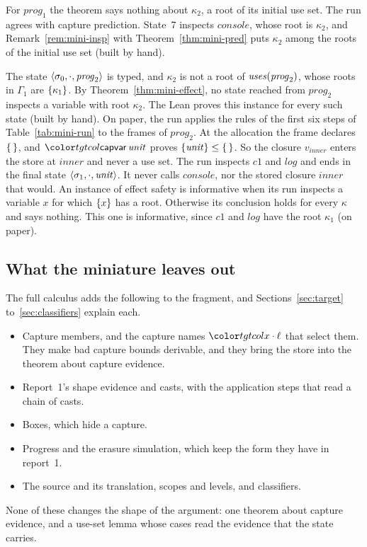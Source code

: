 For $\mathit{prog}_1$ the theorem says nothing about $\kappa_2$, a root of its initial use set. The run agrees with capture prediction. State~7 inspects $\mathit{console}$, whose root is $\kappa_2$, and Remark~\ref{rem:mini-insp} with Theorem~\ref{thm:mini-pred} puts $\kappa_2$ among the roots of the initial use set (built by hand).

\begin{example}\label{ex:mini-prog2}
The state $\langle \sigma_0, \cdot, \mathit{prog}_2\rangle$ is typed, and $\kappa_2$ is not a root of $\mathit{uses}(\mathit{prog}_2)$, whose roots in $\Gamma_1$ are $\{\kappa_1\}$. By Theorem~\ref{thm:mini-effect}, no state reached from $\mathit{prog}_2$ inspects a variable with root $\kappa_2$. The Lean proves this instance for every such state (built by hand). On paper, the run applies the rules of the first six steps of Table~\ref{tab:mini-run} to the frames of $\mathit{prog}_2$. At the allocation the frame declares $\{\,\}$, and $\ev{capvar}\,\mathit{unit}$ proves $\{\mathit{unit}\} \le \{\,\}$. So the closure $v_{\mathit{inner}}$ enters the store at $\mathit{inner}$ and never a use set. The run inspects $\mathit{c1}$ and $\mathit{log}$ and ends in the final state $\langle \sigma_1, \cdot, \mathit{unit}\rangle$. It never calls $\mathit{console}$, nor the stored closure $\mathit{inner}$ that would. An instance of effect safety is informative when its run inspects a variable $x$ for which $\{x\}$ has a root. Otherwise its conclusion holds for every $\kappa$ and says nothing. This one is informative, since $\mathit{c1}$ and $\mathit{log}$ have the root $\kappa_1$ (on paper).
\end{example}

\FloatBarrier
\subsection{What the miniature leaves out}\label{sec:mini-out}

The full calculus adds the following to the fragment, and Sections~\ref{sec:target} to~\ref{sec:classifiers} explain each.
\begin{itemize}
\item Capture members, and the capture names $\sel{x}{\ell}$ that select them. They make bad capture bounds derivable, and they bring the store into the theorem about capture evidence.
\item Report~1's shape evidence and casts, with the application steps that read a chain of casts.
\item Boxes, which hide a capture.
\item Progress and the erasure simulation, which keep the form they have in report~1.
\item The source and its translation, scopes and levels, and classifiers.
\end{itemize}
None of these changes the shape of the argument: one theorem about capture evidence, and a use-set lemma whose cases read the evidence that the state carries.
